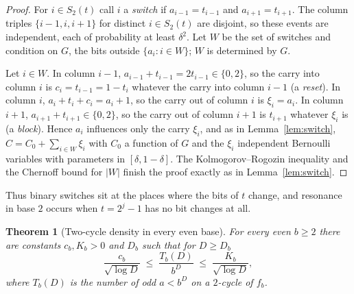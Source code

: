 \documentclass[11pt]{article}
\newtheorem{theorem}{Theorem}[section]
\theoremstyle{definition}
\theoremstyle{remark}
\begin{document}
\begin{proof}
For $i\in S_2(t)$ call $i$ a \emph{switch} if $a_{i-1}=t_{i-1}$ and
$a_{i+1}=t_{i+1}$. The column triples $\{i-1,i,i+1\}$ for distinct
$i\in S_2(t)$ are disjoint, so these events are independent, each of
probability at least $\delta^2$. Let $W$ be the set of switches and condition
on $G$, the bits outside $\{a_i:i\in W\}$; $W$ is determined by $G$.

Let $i\in W$. In column $i-1$, $a_{i-1}+t_{i-1}=2t_{i-1}\in\{0,2\}$, so the
carry into column $i$ is $c_i=t_{i-1}=1-t_i$ whatever the carry into column
$i-1$ (a \emph{reset}). In column $i$, $a_i+t_i+c_i=a_i+1$, so the carry out
of column $i$ is $\xi_i=a_i$. In column $i+1$, $a_{i+1}+t_{i+1}\in\{0,2\}$, so
the carry out of column $i+1$ is $t_{i+1}$ whatever $\xi_i$ is (a
\emph{block}). Hence $a_i$ influences only the carry $\xi_i$, and as in
Lemma~\ref{lem:switch}, $C=C_0+\sum_{i\in W}\xi_i$ with $C_0$ a function of $G$
and the $\xi_i$ independent Bernoulli variables with parameters in
$[\delta,1-\delta]$. The Kolmogorov--Rogozin inequality and the Chernoff bound
for $|W|$ finish the proof exactly as in Lemma~\ref{lem:switch}.
\end{proof}

Thus binary switches sit at the places where the bits of $t$ change, and
resonance in base $2$ occurs when $t=2^j-1$ has no bit changes at all.

\begin{theorem}[Two-cycle density in every even base]\label{thm:evenb}
For every even $b\ge2$ there are constants $c_b,K_b>0$ and $D_b$ such that for
$D\ge D_b$
\[
  \frac{c_b}{\sqrt{\log D}}\;\le\;\frac{T_b(D)}{b^D}\;\le\;\frac{K_b}{\sqrt{\log D}},
\]
where $T_b(D)$ is the number of odd $a<b^D$ on a $2$-cycle of $f_b$.
\end{theorem}
\end{document}
